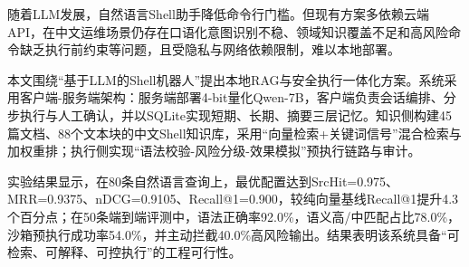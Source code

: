 ﻿\begin{chineseabstract}

随着LLM发展，自然语言Shell助手降低命令行门槛。但现有方案多依赖云端API，在中文运维场景仍存在口语化意图识别不稳、领域知识覆盖不足和高风险命令缺乏执行前约束等问题，且受隐私与网络依赖限制，难以本地部署。

本文围绕“基于LLM的Shell机器人”提出本地RAG与安全执行一体化方案。系统采用客户端-服务端架构：服务端部署4-bit量化Qwen-7B，客户端负责会话编排、分步执行与人工确认，并以SQLite实现短期、长期、摘要三层记忆。知识侧构建45篇文档、88个文本块的中文Shell知识库，采用“向量检索+关键词信号”混合检索与加权重排；执行侧实现“语法校验-风险分级-效果模拟”预执行链路与审计。

实验结果显示，在80条自然语言查询上，最优配置达到SrcHit=0.975、MRR=0.9375、nDCG=0.9105、Recall@1=0.900，较纯向量基线Recall@1提升4.3个百分点；在50条端到端评测中，语法正确率92.0\%，语义高/中匹配占比78.0\%，沙箱预执行成功率54.0\%，并主动拦截40.0\%高风险输出。结果表明该系统具备“可检索、可解释、可控执行”的工程可行性。

\end{chineseabstract}

